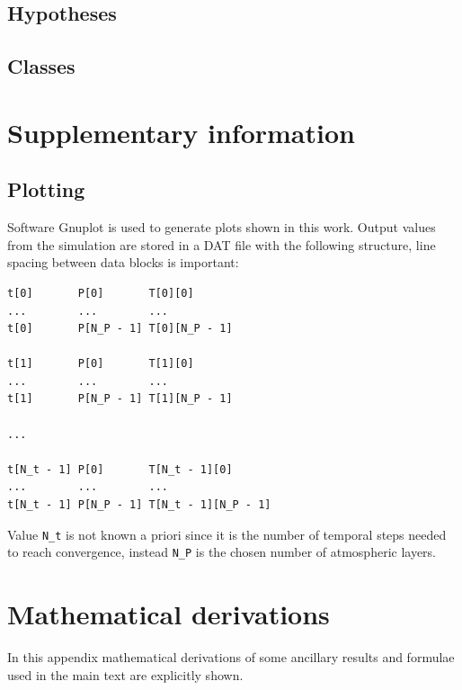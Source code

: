 \documentclass[a4paper,10pt,final,twocolumn]{article}
\begin{document}
\subsection{Hypotheses} %
\label{sec:Hypotheses}



\subsection{Classes}



\section{Supplementary information}



\subsection{Plotting}
\label{sec:Plotting}
Software Gnuplot is used to generate plots shown in this work. Output values from the simulation are stored in a DAT file with the following structure, line spacing between data blocks is important:
\begin{verbatim}
t[0]       P[0]       T[0][0]
...        ...        ...
t[0]       P[N_P - 1] T[0][N_P - 1]

t[1]       P[0]       T[1][0]
...        ...        ...
t[1]       P[N_P - 1] T[1][N_P - 1]

...

t[N_t - 1] P[0]       T[N_t - 1][0]
...        ...        ...
t[N_t - 1] P[N_P - 1] T[N_t - 1][N_P - 1]
\end{verbatim}
Value \verb|N_t| is not known a priori since it is the number of temporal steps needed to reach convergence, instead \verb|N_P| is the chosen number of atmospheric layers.



\section{Mathematical derivations}
In this appendix mathematical derivations of some ancillary results and formulae used in the main text are explicitly shown.
\end{document}
